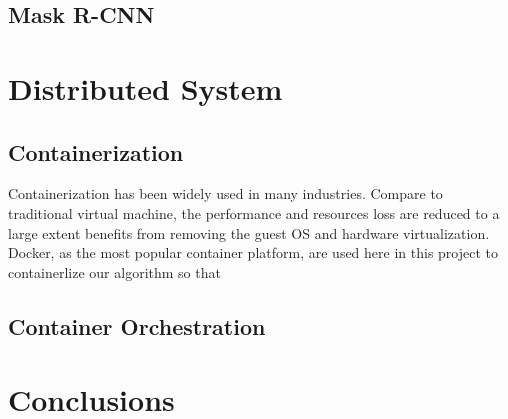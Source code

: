 \documentclass[runningheads]{llncs}
\begin{document}
\subsection{Mask R-CNN}


\section{Distributed System}

\subsection{Containerization}
Containerization has been widely used in many industries. 
Compare to traditional virtual machine, the performance 
and resources loss are reduced to a large extent benefits 
from removing the guest OS and hardware virtualization. 
Docker, as the most popular container platform, are used here
in this project to containerlize our algorithm so that 


\subsection{Container Orchestration}

\section{Conclusions}


\clearpage



\end{document}
